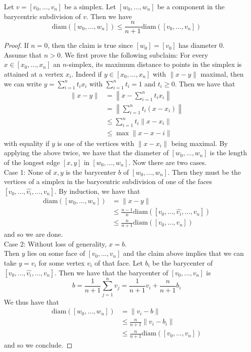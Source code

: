 \documentclass[a4paper]{article}
\begin{document}
\begin{lmm}{}{} Let $v=[v_0,\dots,v_n]$ be a simplex. Let $[w_0,\dots,w_n]$ be a component in the barycentric subdivision of $v$. Then we have $$\text{diam}([w_0,\dots,w_n])\leq\frac{n}{n+1}\text{diam}([v_0,\dots,v_n])$$ 
\begin{proof}
If $n=0$, then the claim is true since $[w_0]=[v_0]$ has diameter $0$. Assume that $n>0$. We first prove the following subclaim: For every $x\in[x_0,\dots,x_n]$ an $n$-simplex, its maximum distance to points in the simplex is attained at a vertex $x_i$. Indeed if $y\in[x_0,\dots,x_n]$ with $\|x-y\|$ maximal, then we can write $y=\sum_{i=1}^nt_ix_i$ with $\sum_{i=1}^nt_i=1$ and $t_i\geq 0$. Then we have that 
\begin{align*}
\|x-y\|&=\left\|x-\sum_{i=1}^nt_ix_i\right\|\\
&=\left\|\sum_{i=1}^nt_i(x-x_i)\right\|\\
&\leq\sum_{i=1}^nt_i\|x-x_i\|\\
&\leq\max\|x-x-i\|
\end{align*}
with equality if $y$ is one of the vertices with $\|x-x_i\|$ being maximal. By applying the above twice, we have that the diameter of $[w_0,\dots,w_n]$ is the length of the longest edge $[x,y]$ in $[w_0,\dots,w_n]$. Now there are two cases. \\

Case 1: None of $x,y$ is the barycenter $b$ of $[w_0,\dots,w_n]$. Then they must be the vertices of a simplex in the barycentric subdivision of one of the faces $[v_0,\dots,\hat{v_i},\dots,v_n]$. By induction, we have that 
\begin{align*}
\text{diam}([w_0,\dots,w_n])&=\|x-y\|\\
&\leq\frac{n-1}{n}\text{diam}([v_0,\dots,\hat{v_i},\dots,v_n])\\
&\leq\frac{n}{n+1}\text{diam}([v_0,\dots,v_n])
\end{align*}
and so we are done. \\

Case 2: Without loss of generality, $x=b$. \\
Then $y$ lies on some face of $[v_0,\dots,v_n]$ and the claim above implies that we can take $y=v_i$ for some vertex $v_i$ of that face. Let $b_i$ be the barycenter of $[v_0,\dots,\hat{v_i},\dots,v_n]$. Then we have that the barycenter of $[v_0,\dots,v_n]$ is $$b=\frac{1}{n+1}\sum_{j=1}^nv_j=\frac{1}{n+1}v_i+\frac{n}{n+1}b_i$$ We thus have that 
\begin{align*}
\text{diam}([w_0,\dots,w_n])&=\|v_i-b\|\\
&\leq\frac{n}{n+1}\|v_i-b_i\|\\
&\leq\frac{n}{n+1}\text{diam}([v_0,\dots,v_n])
\end{align*}
and so we conclude. 
\end{proof}
\end{lmm}
\end{document}
